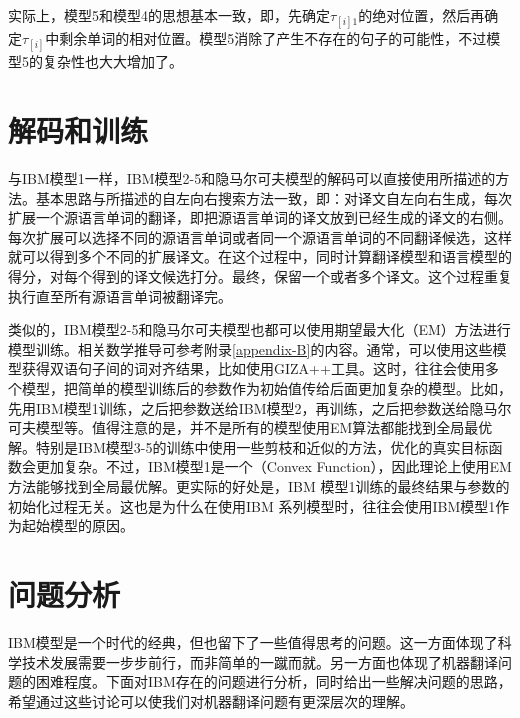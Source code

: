 \parinterval 实际上，模型5和模型4的思想基本一致，即，先确定$\tau_{[i]1}$的绝对位置，然后再确定$\tau_{[i]}$中剩余单词的相对位置。模型5消除了产生不存在的句子的可能性，不过模型5的复杂性也大大增加了。

\sectionnewpage
\section{解码和训练}

\parinterval 与IBM模型1一样，IBM模型2-5和隐马尔可夫模型的解码可以直接使用{\chapterfive}所描述的方法。基本思路与{\chaptertwo}所描述的自左向右搜索方法一致，即：对译文自左向右生成，每次扩展一个源语言单词的翻译，即把源语言单词的译文放到已经生成的译文的右侧。每次扩展可以选择不同的源语言单词或者同一个源语言单词的不同翻译候选，这样就可以得到多个不同的扩展译文。在这个过程中，同时计算翻译模型和语言模型的得分，对每个得到的译文候选打分。最终，保留一个或者多个译文。这个过程重复执行直至所有源语言单词被翻译完。

\parinterval 类似的，IBM模型2-5和隐马尔可夫模型也都可以使用期望最大化（EM）方法进行模型训练。相关数学推导可参考附录\ref{appendix-B}的内容。通常，可以使用这些模型获得双语句子间的词对齐结果，比如使用GIZA++工具。这时，往往会使用多个模型，把简单的模型训练后的参数作为初始值传给后面更加复杂的模型。比如，先用IBM模型1训练，之后把参数送给IBM模型2，再训练，之后把参数送给隐马尔可夫模型等。值得注意的是，并不是所有的模型使用EM算法都能找到全局最优解。特别是IBM模型3-5的训练中使用一些剪枝和近似的方法，优化的真实目标函数会更加复杂。不过，IBM模型1是一个{\small{}}（Convex Function），因此理论上使用EM方法能够找到全局最优解。更实际的好处是，IBM 模型1训练的最终结果与参数的初始化过程无关。这也是为什么在使用IBM 系列模型时，往往会使用IBM模型1作为起始模型的原因。


\sectionnewpage
\section{问题分析}

\parinterval IBM模型是一个时代的经典，但也留下了一些值得思考的问题。这一方面体现了科学技术发展需要一步步前行，而非简单的一蹴而就。另一方面也体现了机器翻译问题的困难程度。下面对IBM存在的问题进行分析，同时给出一些解决问题的思路，希望通过这些讨论可以使我们对机器翻译问题有更深层次的理解。

